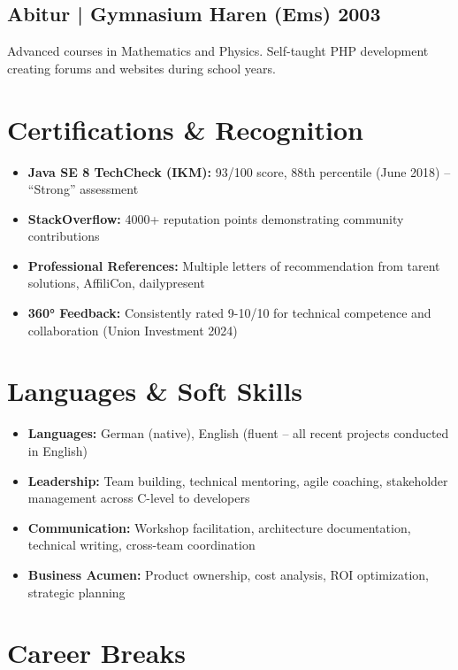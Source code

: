 \documentclass[10pt,a4paper]{article}
\begin{document}
\subsection*{Abitur | Gymnasium Haren (Ems) \hfill 2003}
Advanced courses in Mathematics and Physics. Self-taught PHP development creating forums and websites during school years.

\section*{Certifications \& Recognition}

\begin{itemize}[leftmargin=*]
\item \textbf{Java SE 8 TechCheck (IKM):} 93/100 score, 88th percentile (June 2018) -- ``Strong'' assessment
\item \textbf{StackOverflow:} 4000+ reputation points demonstrating community contributions
\item \textbf{Professional References:} Multiple letters of recommendation from tarent solutions, AffiliCon, dailypresent
\item \textbf{360° Feedback:} Consistently rated 9-10/10 for technical competence and collaboration (Union Investment 2024)
\end{itemize}

\section*{Languages \& Soft Skills}

\begin{itemize}[leftmargin=*]
\item \textbf{Languages:} German (native), English (fluent -- all recent projects conducted in English)
\item \textbf{Leadership:} Team building, technical mentoring, agile coaching, stakeholder management across C-level to developers
\item \textbf{Communication:} Workshop facilitation, architecture documentation, technical writing, cross-team coordination
\item \textbf{Business Acumen:} Product ownership, cost analysis, ROI optimization, strategic planning
\end{itemize}

\section*{Career Breaks}
\end{document}
